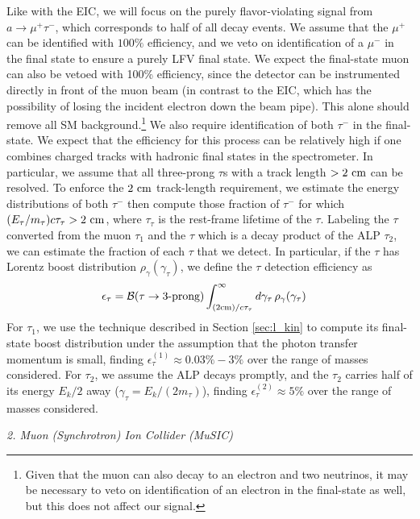 Like with the EIC, we will focus on the purely flavor-violating signal from $a \rightarrow \mu^+\tau^-$, which corresponds to half of all decay events. We assume that the $\mu^+$ can be identified with $100\%$ efficiency, and we veto on identification of a $\mu^-$ in the final state to ensure a purely LFV final state. We expect the final-state muon can also be vetoed with 100\% efficiency, since the detector can be instrumented directly in front of the muon beam (in contrast to the EIC, which has the possibility of losing the incident electron down the beam pipe). This alone should remove all SM background.\footnote{Given that the muon can also decay to an  electron and two neutrinos, it may be necessary to veto on identification of an electron in the final-state as well, but this does not affect our signal.} We also require identification of both $\tau^-$ in the final-state. We expect that the efficiency for this process can be relatively high if one combines charged tracks with hadronic final states in the spectrometer. In particular, we assume that all three-prong $\tau$s with a track length $>2~{\rm cm}$ can be resolved. To enforce the $2~{\rm cm}$ track-length requirement, we estimate the energy distributions of both $\tau^-$ then compute those fraction of $\tau^-$ for which $(E_\tau/m_\tau) c \tau_\tau > 2~{\rm cm}$, where $\tau_\tau$ is the rest-frame lifetime of the $\tau$. Labeling the $\tau$ converted from the muon $\tau_1$ and the $\tau$ which is a decay product of the ALP $\tau_2$, we can estimate the fraction of each $\tau$ that we detect. In particular, if the $\tau$ has Lorentz boost distribution $\rho_\gamma(\gamma_\tau)$, we define the $\tau$ detection efficiency as 
\begin{align}
    \epsilon_\tau &= {\cal B}(\tau \rightarrow \textrm{3-prong})\int_{(2{\rm cm})/c\tau_\tau}^{\infty} d\gamma_\tau\,\rho_\gamma(\gamma_\tau)
\end{align}
For $\tau_1$, we use the technique described in Section {\ref{sec:l_kin}} to compute its final-state boost distribution under the assumption that the photon transfer momentum is small, finding $\epsilon_\tau^{(1)} \approx 0.03\%-3\%$ over the range of masses considered. For $\tau_2$, we assume the ALP decays promptly, and the $\tau_2$ carries half of its energy $E_k/2$ away ($\gamma_\tau = E_k/(2m_\tau)$), finding $\epsilon_\tau^{(2)} \approx  5\%$ over the range of masses considered.



\begin{center}
    {\it 2. Muon (Synchrotron) Ion Collider (MuSIC)}
\end{center}

